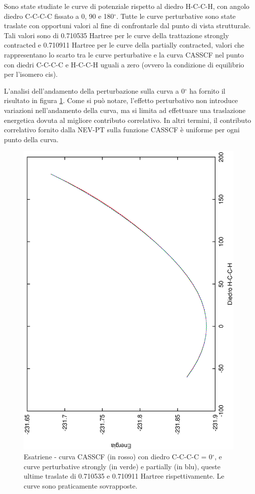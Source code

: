 Sono state studiate le curve di potenziale rispetto al diedro H-C-C-H,
con angolo diedro C-C-C-C fissato a 0, 90 e 180$^{\circ}$. Tutte le
curve perturbative sono state traslate con opportuni valori al
fine di confrontarle dal punto di vista strutturale. Tali valori sono
di 0.710535 Hartree per le curve della trattazione strongly contracted e
0.710911 Hartree per le curve della partially contracted, valori che
rappresentano lo scarto tra le curve perturbative e la curva CASSCF nel 
punto con diedri C-C-C-C e H-C-C-H uguali a zero (ovvero la condizione di
equilibrio per l'isomero cis). 

L'analisi dell'andamento della perturbazione sulla curva a 0$^{\circ}$ ha
fornito il risultato in figura \ref{fig:esatriene_perturb_c0}.
Come si pu\`o notare, l'effetto perturbativo non introduce variazioni
nell'andamento della curva, ma si limita ad effettuare una traslazione
energetica dovuta al migliore contributo correlativo. In altri termini, il
contributo correlativo fornito dalla NEV-PT sulla funzione CASSCF \`e
uniforme per ogni punto della curva.

\begin{figure}[ht]
\begin{center}
\includegraphics[angle=270,width=12cm,keepaspectratio]{immagini/esatriene/perturb_c0.eps}
\caption{\small Esatriene - curva CASSCF (in rosso) con diedro C-C-C-C = 0$^{\circ}$, e curve perturbative
strongly (in verde) e partially (in blu), queste ultime traslate di 0.710535 e 0.710911 Hartree rispettivamente. Le
curve sono praticamente sovrapposte.}
\label{fig:esatriene_perturb_c0}
\end{center}
\end{figure}

